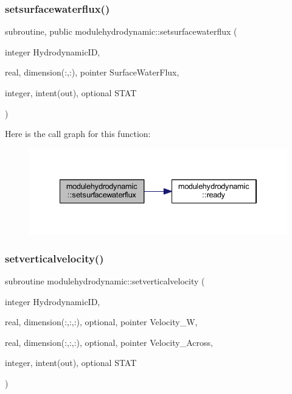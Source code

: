 \subsubsection{\texorpdfstring{setsurfacewaterflux()}{setsurfacewaterflux()}}
{\footnotesize\ttfamily subroutine, public modulehydrodynamic\+::setsurfacewaterflux (\begin{DoxyParamCaption}\item[{integer}]{Hydrodynamic\+ID,  }\item[{real, dimension(\+:,\+:), pointer}]{Surface\+Water\+Flux,  }\item[{integer, intent(out), optional}]{S\+T\+AT }\end{DoxyParamCaption})}

Here is the call graph for this function\+:\nopagebreak
\begin{figure}[H]
\begin{center}
\leavevmode
\includegraphics[width=334pt]{namespacemodulehydrodynamic_a9f134631e27c5fcbe9d6185409149bb5_cgraph}
\end{center}
\end{figure}
\mbox{\label{namespacemodulehydrodynamic_a0ed7fd6441646298396381636f172534}} 
\subsubsection{\texorpdfstring{setverticalvelocity()}{setverticalvelocity()}}
{\footnotesize\ttfamily subroutine modulehydrodynamic\+::setverticalvelocity (\begin{DoxyParamCaption}\item[{integer}]{Hydrodynamic\+ID,  }\item[{real, dimension(\+:,\+:,\+:), optional, pointer}]{Velocity\+\_\+W,  }\item[{real, dimension(\+:,\+:,\+:), optional, pointer}]{Velocity\+\_\+\+Across,  }\item[{integer, intent(out), optional}]{S\+T\+AT }\end{DoxyParamCaption})\hspace{0.3cm}{\ttfamily [private]}}

